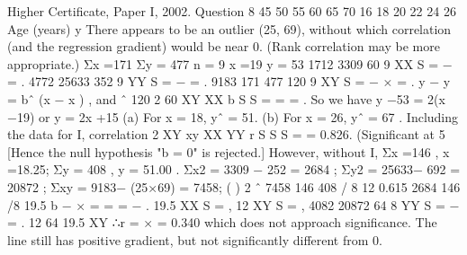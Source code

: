 \documentclass[a4paper,12pt]{article}
\begin{document}
Higher Certificate, Paper I, 2002. Question 8
45
50
55
60
65
70
16 18 20 22 24 26
Age (years)
y
There appears to be an outlier (25, 69), without which correlation (and the regression
gradient) would be near 0. (Rank correlation may be more appropriate.)
Σx =171 Σy = 477 n = 9 x =19 y = 53
1712 3309 60
9 XX S = − = .
4772 25633 352
9 YY S = − = . 9183 171 477 120
9 XY S = − × = .
y − y = bˆ (x − x ) , and ˆ 120 2
60
XY
XX
b S
S
= = = .
So we have y −53 = 2(x −19) or y = 2x +15
(a) For x = 18, yˆ = 51. (b) For x = 26, yˆ = 67 .
Including the data for I, correlation
2
XY
xy
XX YY
r S
S S
= = 0.826. (Significant at 5%
[Hence the null hypothesis "b = 0" is rejected.]
However, without I, Σx =146 , x =18.25; Σy = 408 , y = 51.00 .
Σx2 = 3309 − 252 = 2684 ; Σy2 = 25633− 692 = 20872 ;
Σxy = 9183− (25×69) = 7458; ( )
2
ˆ 7458 146 408 / 8 12 0.615
2684 146 /8 19.5
b
− ×
= = =
−
.
19.5 XX S = , 12 XY S = ,
4082 20872 64
8 YY S = − = .
12
64 19.5 XY ∴r =
×
= 0.340 which does not approach significance. The line still has
positive gradient, but not significantly different from 0.
\end{document}
